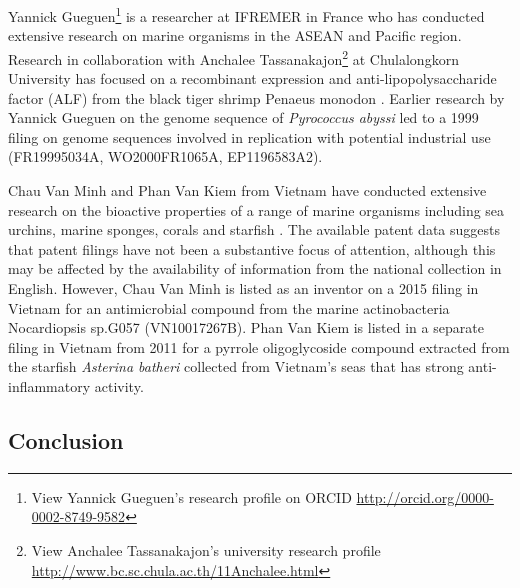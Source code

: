 \documentclass[openany]{book}
\let\rmarkdownfootnote\footnote%
\def\footnote{\protect\rmarkdownfootnote}
\theoremstyle{definition}
\theoremstyle{definition}
\theoremstyle{definition}
\theoremstyle{remark}
\begin{document}
Yannick Gueguen\footnote{View Yannick Gueguen's research profile on
  ORCID \url{http://orcid.org/0000-0002-8749-9582}} is a researcher at
IFREMER in France who has conducted extensive research on marine
organisms in the ASEAN and Pacific region. Research in collaboration
with Anchalee Tassanakajon\footnote{View Anchalee Tassanakajon's
  university research profile
  \url{http://www.bc.sc.chula.ac.th/11Anchalee.html}} at Chulalongkorn
University has focused on a recombinant expression and
anti-lipopolysaccharide factor (ALF) from the black tiger shrimp Penaeus
monodon \citep{Somboonwiwat_2005}. Earlier research by Yannick Gueguen
on the genome sequence of \emph{Pyrococcus abyssi} led to a 1999 filing
on genome sequences involved in replication with potential industrial
use (FR19995034A, WO2000FR1065A, EP1196583A2).

Chau Van Minh and Phan Van Kiem from Vietnam have conducted extensive
research on the bioactive properties of a range of marine organisms
including sea urchins, marine sponges, corals and starfish
\citep{Thao_2015, Thao_2015a, Kiem_2017, Ngoc_2017, Vien_2016}. The
available patent data suggests that patent filings have not been a
substantive focus of attention, although this may be affected by the
availability of information from the national collection in English.
However, Chau Van Minh is listed as an inventor on a 2015 filing in
Vietnam for an antimicrobial compound from the marine actinobacteria
Nocardiopsis sp.G057 (VN10017267B). Phan Van Kiem is listed in a
separate filing in Vietnam from 2011 for a pyrrole oligoglycoside
compound extracted from the starfish \emph{Asterina batheri} collected
from Vietnam's seas that has strong anti-inflammatory activity.

\hypertarget{conclusion-2}{%
\subsection{Conclusion}\label{conclusion-2}}
\end{document}
